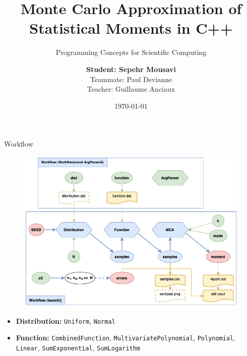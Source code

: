 \documentclass[8pt]{beamer}
\author{
    \textbf{Student: Sepehr Mousavi} \\
    Teammate: Paul Devianne \\
    Teacher: Guillaume Anciaux
}
\title[MCA]{Monte Carlo Approximation of Statistical Moments in C++}
\subtitle[PCSC]{Programming Concepts for Scientific Computing}
\institute[EPFL]{{École Polytechnique Fédérale de Lausanne}}
\date{\today}
\begin{document}
\frame{\titlepage}

\begin{frame}{Workflow}

    \begin{figure}
        \centering
        \includegraphics[height=.68\textheight]{img/diag_workflow.png}
    \end{figure}

  \begin{itemize}
    \item \textbf{Distribution:} \texttt{Uniform}, \texttt{Normal}
    \item \textbf{Function:}
        \texttt{CombinedFunction},
        \texttt{MultivariatePolynomial}, \texttt{Polynomial}, \texttt{Linear},
        \texttt{SumExponential}, \texttt{SumLogarithm}
  \end{itemize}

\end{frame}
\end{document}
